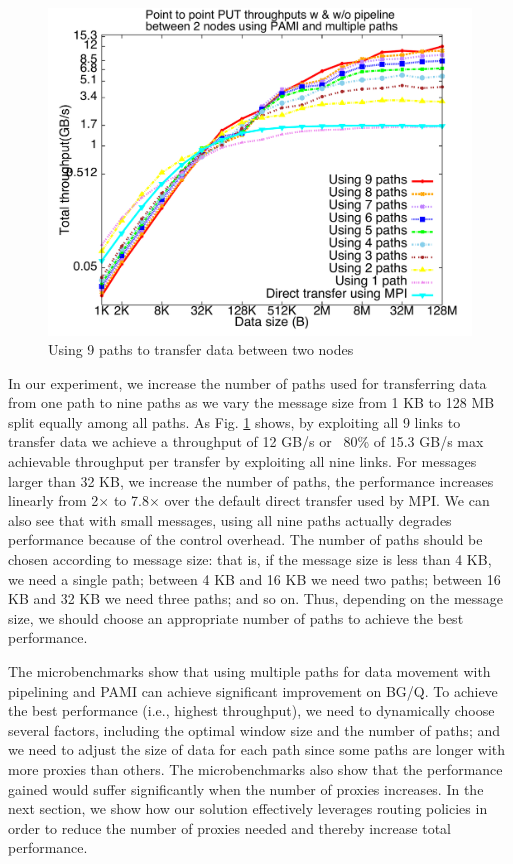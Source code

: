 \documentclass[final,5p,times]{elsarticle}
\begin{document}
\begin{figure}[!htb]
\centering
\includegraphics[scale=0.3]{pami_multipaths.pdf}
\caption{Using 9 paths to transfer data between two nodes}
\label{fig:pipeline_proxies}
\end{figure}

In our experiment, we increase the number of paths used for transferring data from one path to nine paths as we vary the message size from 1 KB to 128 MB split equally among all paths. As Fig. \ref{fig:pipeline_proxies} shows, by exploiting all 9 links to transfer data we achieve a throughput of 12 GB/s  or ~80\% of 15.3 GB/s max achievable throughput per transfer by exploiting all nine links. For messages larger than 32 KB, we increase the number of paths, the performance increases linearly from 2$\times$ to 7.8$\times$ over the default direct transfer used by MPI. We can also see that with small messages, using all nine paths actually degrades performance because of the control overhead. The number of paths should be chosen according to message size: that is, if the message size is less than 4 KB, we need a single path; between 4 KB and 16 KB we need two paths; between 16 KB and 32 KB we need three paths; and so on. Thus, depending on the message size, we should choose an appropriate number of paths to achieve the best performance.

The microbenchmarks show that using multiple paths for data movement with pipelining and PAMI can achieve significant improvement on BG/Q. To achieve the best performance (i.e., highest throughput), we need to dynamically choose several factors, including the optimal window size and the number of paths; and we need to adjust the size of data for each path since some paths are longer with more proxies than others. The microbenchmarks also show that the performance gained would suffer significantly when the number of proxies increases. In the next section, we show how our solution effectively leverages routing policies in order  to reduce the number of proxies needed and thereby increase total performance.
\end{document}
